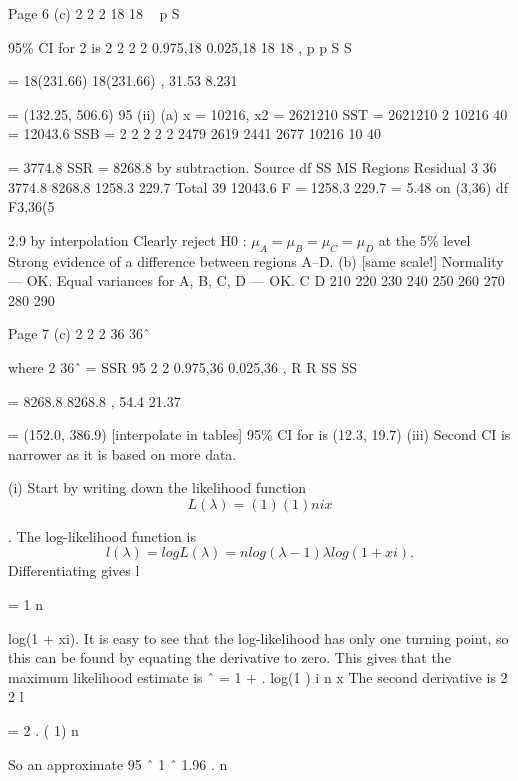 \documentclass[a4paper,12pt]{article}
\begin{document}
Page 6
(c)
2
2
2 18
18
~ p
S


 95\% CI for 2 is
2 2
2 2
0.975,18 0.025,18
18 18
, p p
 S S 
 
=
18(231.66) 18(231.66)
,
31.53 8.231


= (132.25, 506.6)
 95%
(ii) (a) x = 10216, x2 = 2621210
SST = 2621210 
2 10216
40
= 12043.6
SSB =
2 2 2 2 2 2479 2619 2441 2677 10216
10 40
  
 = 3774.8
 SSR = 8268.8 by subtraction.
Source df SS MS
Regions
Residual
3
36
3774.8
8268.8
1258.3
229.7
Total 39 12043.6
F =
1258.3
229.7
= 5.48 on (3,36) df
F3,36(5%

2.9 by interpolation
Clearly reject H0 : $\mu_A = \mu_B = \mu_C = \mu_D$ at the 5\% level
 Strong evidence of a difference between regions A–D.
(b)
[same scale!]
Normality — OK.
Equal variances for A, B, C, D — OK.
 C
D
210 220 230 240 250 260 270 280 290

Page 7
(c)
2
2
2 36
36ˆ
~



where 2 36ˆ = SSR
 95%
2 2
0.975,36 0.025,36
,
R R  SS SS 

=
8268.8 8268.8
,
54.4 21.37
 

= (152.0, 386.9) [interpolate in tables]
 95\% CI for  is (12.3, 19.7)
(iii) Second CI is narrower as it is based on more data.



\item (i) Start by writing down the likelihood function
\[L(\lambda) =
( 1)
(1 )
n
i x\]

 
 
.
The log-likelihood function is
\[l(\lambda) = log L(\lambda) = n log(\lambda -1)  \lambda log(1 + xi).\]
Differentiating gives
l

=
1
n
 
 log(1 + xi).
It is easy to see that the log-likelihood has only one turning point, so this
can be found by equating the derivative to zero. This gives that the
maximum likelihood estimate is
ˆ
= 1 + .
log(1 ) i
n
  x
The second derivative is
2
2
 l

= 2 .
( 1)
n
 
So an approximate 95%
ˆ 1
ˆ 1.96 .
n
 
 
\end{document}
